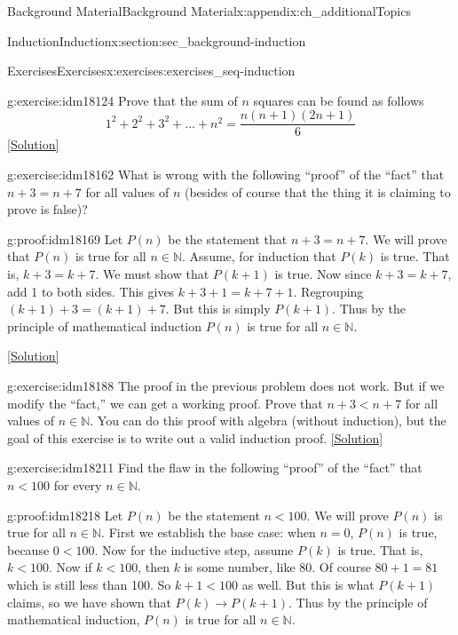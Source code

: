 \documentclass[oneside,10pt,]{book}
\numberwithin{equation}{chapter}
\def\N{\mathbb N}
\def\imp{\rightarrow}
\newcommand{\lt}{<}
\begin{document}
\begin{appendixptx}{Background Material}{}{Background Material}{}{}{x:appendix:ch_additionalTopics}
\begin{sectionptx}{Induction}{}{Induction}{}{}{x:section:sec_background-induction}
\begin{exercises-subsection}{Exercises}{}{Exercises}{}{}{x:exercises:exercises_seq-induction}
\begin{divisionexercise}{9}{}{}{g:exercise:idm18124}%
Prove that the sum of \(n\) squares can be found as follows%
\begin{equation*}
1^2 +2^2 +3^2+...+n^2 = \frac{n(n+1)(2n+1)}{6}
\end{equation*}
%
\space\hspace*{0pt}\hfill{\tiny\hyperlink{g:solution:idm18129-main}{[Solution]}}\end{divisionexercise}%
\begin{divisionexercise}{10}{}{}{g:exercise:idm18162}%
What is wrong with the following ``proof'' of the ``fact'' that \(n+3 = n+7\) for all values of \(n\) (besides of course that the thing it is claiming to prove is false)?%
\begin{proofptx}{}{g:proof:idm18169}
Let \(P(n)\) be the statement that \(n + 3 = n + 7\). We will prove that \(P(n)\) is true for all \(n \in \N\). Assume, for induction that \(P(k)\) is true. That is, \(k+3 = k+7\). We must show that \(P(k+1)\) is true. Now since \(k + 3 = k + 7\), add 1 to both sides. This gives \(k + 3 + 1 = k + 7 + 1\). Regrouping \((k+1) + 3 = (k+1) + 7\). But this is simply \(P(k+1)\). Thus by the principle of mathematical induction \(P(n)\) is true for all \(n \in \N\).%
\end{proofptx}
\space\hspace*{0pt}\hfill{\tiny\hyperlink{g:solution:idm18184-main}{[Solution]}}\end{divisionexercise}%
\begin{divisionexercise}{11}{}{}{g:exercise:idm18188}%
The proof in the previous problem does not work. But if we modify the ``fact,'' we can get a working proof. Prove that \(n + 3 \lt  n + 7\) for all values of \(n \in \N\). You can do this proof with algebra (without induction), but the goal of this exercise is to write out a valid induction proof.%
\space\hspace*{0pt}\hfill{\tiny\hyperlink{g:solution:idm18194-main}{[Solution]}}\end{divisionexercise}%
\begin{divisionexercise}{12}{}{}{g:exercise:idm18211}%
Find the flaw in the following ``proof'' of the ``fact'' that \(n \lt  100\) for every \(n \in \N\).%
\begin{proofptx}{}{g:proof:idm18218}
Let \(P(n)\) be the statement \(n \lt  100\). We will prove \(P(n)\) is true for all \(n \in \N\). First we establish the base case: when \(n = 0\), \(P(n)\) is true, because \(0 \lt  100\). Now for the inductive step, assume \(P(k)\) is true. That is, \(k \lt  100\). Now if \(k \lt  100\), then \(k\) is some number, like 80. Of course \(80+1 = 81\) which is still less than 100. So \(k +1 \lt  100\) as well. But this is what \(P(k+1)\) claims, so we have shown that \(P(k) \imp P(k+1)\). Thus by the principle of mathematical induction, \(P(n)\) is true for all \(n \in \N\).%

\end{proofptx}
\end{divisionexercise}
\end{exercises-subsection}
\end{sectionptx}
\end{appendixptx}
\end{document}

